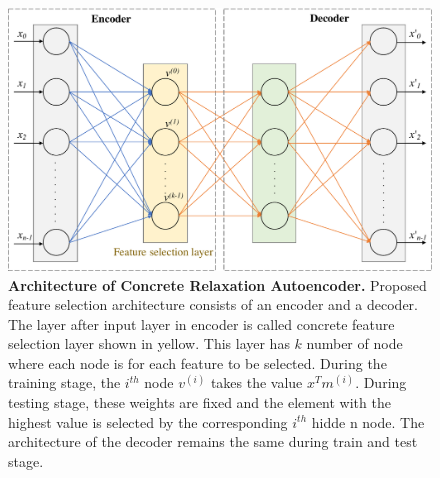 \documentclass{bioinfo}
\begin{document}
\begin{figure}[h!]
    \centering
    \includegraphics[scale=0.5]{fig/architecture.pdf}
    \caption{\textbf{Architecture of Concrete Relaxation Autoencoder.} Proposed feature selection architecture consists of an encoder and a decoder. The layer after input layer in encoder is called concrete feature selection layer shown in yellow. This layer has $k$ number of node where each node is for each feature to be selected. During the training stage, the $i^{th}$ node $v^{(i)}$ takes the value $x^Tm^{(i)}$.
During testing stage, these weights are fixed and the element with the highest value is selected by the corresponding $i^{th}$ hidde
n node.
The architecture of the decoder remains the same during train and test stage.}
    \label{fig:architecture}
\end{figure}
\end{document}
